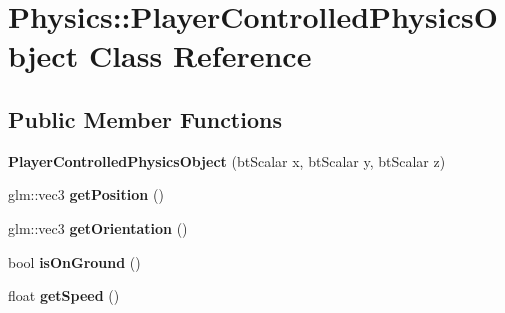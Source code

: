 \hypertarget{class_physics_1_1_player_controlled_physics_object}{}\section{Physics\+:\+:Player\+Controlled\+Physics\+Object Class Reference}
\label{class_physics_1_1_player_controlled_physics_object}
\subsection*{Public Member Functions}
\begin{DoxyCompactItemize}
\item 
{\bfseries Player\+Controlled\+Physics\+Object} (bt\+Scalar x, bt\+Scalar y, bt\+Scalar z)\hypertarget{class_physics_1_1_player_controlled_physics_object_aa655766dbd11f5dd69b63b17724121ab}{}\label{class_physics_1_1_player_controlled_physics_object_aa655766dbd11f5dd69b63b17724121ab}

\item 
glm\+::vec3 {\bfseries get\+Position} ()\hypertarget{class_physics_1_1_player_controlled_physics_object_a4e9971ece59da1f83e629efca331dbc6}{}\label{class_physics_1_1_player_controlled_physics_object_a4e9971ece59da1f83e629efca331dbc6}

\item 
glm\+::vec3 {\bfseries get\+Orientation} ()\hypertarget{class_physics_1_1_player_controlled_physics_object_af3f5f1d771942844871c0ea46d5a9661}{}\label{class_physics_1_1_player_controlled_physics_object_af3f5f1d771942844871c0ea46d5a9661}

\item 
bool {\bfseries is\+On\+Ground} ()\hypertarget{class_physics_1_1_player_controlled_physics_object_a1d9995190d3784cb474ee9fb5bacc127}{}\label{class_physics_1_1_player_controlled_physics_object_a1d9995190d3784cb474ee9fb5bacc127}

\item 
float {\bfseries get\+Speed} ()\hypertarget{class_physics_1_1_player_controlled_physics_object_a620ef54eca7f966af29a16c911b88a86}{}\label{class_physics_1_1_player_controlled_physics_object_a620ef54eca7f966af29a16c911b88a86}

\end{DoxyCompactItemize}
